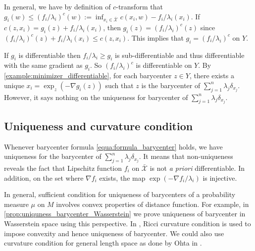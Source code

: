 \begin{rmk}
	In general, we have by definition of $c$-transform that
	$g_i(w) \leq (f_i / \lambda_i)^c(w) := \inf_{x_i \in \bar{ \mathcal{X} } } c(x_i, w) - f_i / \lambda_i (x_i)$.
	If $ c(z, x_i) = g_i (z) + f_i / \lambda_i (x_i)$,
	then
	$g_i(z) = (f_i / \lambda_i)^c (z)$ since $(f_i / \lambda_i)^c(z) + f_i / \lambda_i(x_i) \leq c (z, x_i)$.
	This implies that $g_i = (f_i / \lambda_i)^c$ on $Y$.

	If $g_i$ is differentiable then $f_i / \lambda_i \geq g_i$ is sub-differentiable
	and thus differentiable with the same gradient as $g_i$.
	So $(f_i / \lambda_i)^c$ is differentiable on $Y$.
	By \cref{example:minimizer_differentiable}, for each barycenter $z \in Y$,
	there exists a unique $x_i = \exp_z (- \nabla g_i (z))$ such that $z$ is the barycenter
	of $\sum_{j=1}^n \lambda_j \delta_{x_j}$.
	However, it says nothing on the uniqueness for barycenter of $\sum_{j=1}^n \lambda_j \delta_{x_j}$.

\end{rmk}

\subsection{Uniqueness and curvature condition}

Whenever barycenter formula \cref{equa:formula_barycenter} holds,
we have uniqueness for the barycenter of $\sum_{j=1}^n \lambda_j \delta_{x_j}$.
It means that non-uniqueness reveals the fact that Lipschitz function
$f_i$ on $\bar{ \mathcal{X} }$ is not \emph{a priori} differentiable.
In addition, on the set where $\nabla f_i$ exists, the map
$\exp( -\nabla f_i / \lambda_i )$ is injective.

In general, sufficient condition for uniqueness of barycenters of a probability measure $\mu$ on $M$
involves convex properties of distance function.
For example, in \cref{prop:uniquness_barycenter_Wasserstein} we prove uniqueness of barycenter in Wasserstein space
using this perspective.
In \cite[Proposition IX.7.1]{chavel2006riemannian}, Ricci curvature condition is used
to impose convexity and hence uniqueness of barycenter.
We could also use curvature condition for general length space as done by Ohta in \cite{ohta2012barycenters}.

